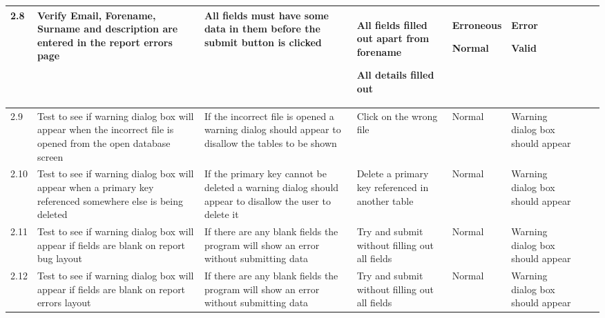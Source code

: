 \begin{landscape}
\begin{center}
\begin{longtable}{|p{1.5cm}|p{2cm}|p{2.5cm}|p{4cm}|p{2cm}|p{2cm}|p{1cm}|p{1.7cm}|}
2.8 & Verify Email, Forename, Surname and description are entered in the report errors page & All fields must have some data in them before the submit  button is clicked & All fields filled out apart from forename \par \bigskip All details filled out & Erroneous \par \bigskip \bigskip Normal & Error \par \bigskip \bigskip Valid && \\ \hline
\rowcolor{green}2.9 & Test to see if warning dialog box will appear when the incorrect file is opened from the open database screen & If the incorrect file is opened a warning dialog should appear to disallow the tables to be shown & Click on the wrong file & Normal &Warning dialog box should appear && \\ \hline
\rowcolor{green}2.10& Test to see if warning dialog box will appear when a primary key referenced somewhere else is being deleted & If the primary key cannot be deleted a warning dialog should appear to disallow the user to delete it & Delete a primary key referenced in another table & Normal &Warning dialog box should appear && \\ \hline
\rowcolor{green}2.11& Test to see if warning dialog box will appear if fields are blank on report bug layout & If there are any blank fields the program will show an error without submitting data & Try and submit without filling out all fields & Normal &Warning dialog box should appear && \\ \hline
\rowcolor{green}2.12& Test to see if warning dialog box will appear if fields are blank on report errors layout & If there are any blank fields the program will show an error without submitting data & Try and submit without filling out all fields & Normal &Warning dialog box should appear && \\ \hline



\end{longtable}
\end{center}
\end{landscape}
